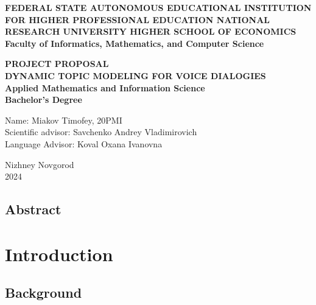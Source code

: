 \documentclass{article}
\begin{document}
\pagestyle{empty}

\begin{center}
    {\bf FEDERAL STATE AUTONOMOUS EDUCATIONAL INSTITUTION FOR 
    HIGHER PROFESSIONAL EDUCATION NATIONAL RESEARCH 
    UNIVERSITY HIGHER SCHOOL OF ECONOMICS}\\
    \vspace{1cm}
    {\bf Faculty of Informatics, Mathematics, and Computer Science}
\end{center}

\vspace{4cm}
\begin{center}
    {\bf PROJECT PROPOSAL}\\
    {\bf DYNAMIC TOPIC MODELING FOR VOICE DIALOGIES\\}
    \vspace{0.3cm}
    {\bf Applied Mathematics and Information Science\\} 
    \vspace{0.3cm}
    {\bf Bachelor's Degree}
\end{center}

\vspace{3.5cm}\vfill
\begin{flushleft}
    \hfill Name: Miakov Timofey, 20PMI \\
    \hfill Scientific advisor: Savchenko Andrey Vladimirovich\\
    \hfill 
    \hfill Language Advisor: Koval Oxana Ivanovna\\
\end{flushleft}

\vfill
\begin{center}
  Nizhney Novgorod \\ 2024
\end{center}

\pagebreak
\pagestyle{plain}

\newpage
\tableofcontents

\newpage
\begin{center}
    \section*{Abstract}
\end{center}

\newpage
\section{Introduction}
\subsection{Background}
\end{document}
